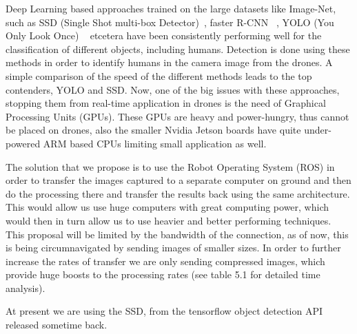 	Deep Learning based approaches trained on the large datasets like Image-Net, such as SSD (Single Shot multi-box Detector)~\cite{liu2016ssd}, faster R-CNN ~\cite{ren2015faster}, YOLO (You Only Look
	Once) ~\cite{redmon2016you} etcetera have been consistently performing well for the classification of different objects, including humans. Detection is done using these methods in order to identify humans in the camera image from the drones. A simple comparison of the speed of the different methods leads to the top contenders, YOLO and SSD. Now, one of the big issues with these approaches, stopping them from real-time
	application in drones is the need of Graphical Processing Units (GPUs). These GPUs are heavy and power-hungry, thus cannot be placed on drones, also the smaller Nvidia Jetson boards have quite under-powered ARM based CPUs limiting small application as well.
	
	The solution that we propose is to use the Robot Operating System (ROS) in order to transfer the images captured to a separate computer on ground and then do the processing there and transfer the results back using the same architecture. This would allow us use huge computers with great computing power, which would then in turn allow us to use heavier and better performing techniques. This proposal
	will be limited by the bandwidth of the connection, as of now, this is being circumnavigated by sending images of smaller sizes. In order to further increase the rates of transfer we are only sending compressed images, which provide huge boosts to the processing rates (see table 5.1 for detailed time analysis).
	
	At present we are using the SSD, from the tensorflow object detection API ~\cite{tensorgit} released sometime back.
	
	
